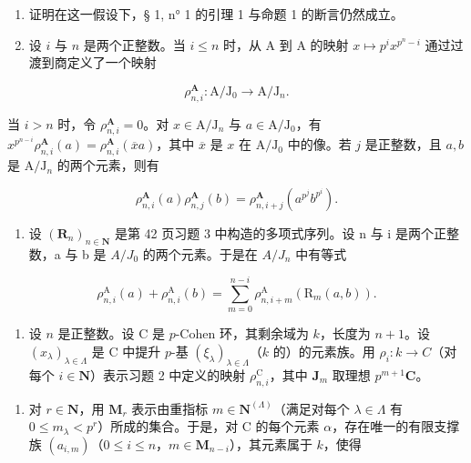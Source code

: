 \begin{enumerate}
\def\labelenumi{\alph{enumi})}
\item
  证明在这一假设下，§ 1, n° 1 的引理 1 与命题 1 的断言仍然成立。
\item
  设 \(i\) 与 \(n\) 是两个正整数。当 \(i \leqslant n\) 时，从 A 到 A 的映射 \(x \mapsto p^i x^{p^n - i}\) 通过过渡到商定义了一个映射
\end{enumerate}

\[
\rho_ {n, i} ^ {\mathbf {A}}: \mathrm{A} / \mathrm{J} _ {0} \rightarrow \mathrm{A} / \mathrm{J} _ {n}.
\]

当 \(i > n\) 时，令 \(\rho_{n,i}^{\mathbf{A}} = 0\)。对 \(x \in \mathrm{A} / \mathrm{J}_n\) 与 \(a \in \mathrm{A} / \mathrm{J}_0\)，有 \(x^{p^{n - i}} \rho_{n,i}^{\mathbf{A}}(a) = \rho_{n,i}^{\mathbf{A}}(\overline{x} a)\)，其中 \(\overline{x}\) 是 \(x\) 在 \(\mathrm{A} / \mathrm{J}_0\) 中的像。若 \(j\) 是正整数，且 \(a, b\) 是 \(\mathrm{A} / \mathrm{J}_n\) 的两个元素，则有

\[
\rho_ {n, i} ^ {\mathbf {A}} (a) \rho_ {n, j} ^ {\mathbf {A}} (b) = \rho_ {n, i + j} ^ {\mathbf {A}} \left(a ^ {p ^ {j}} b ^ {p ^ {i}}\right).
\]

\begin{enumerate}
\def\labelenumi{\alph{enumi})}
\setcounter{enumi}{2}
\tightlist
\item
  设 \((\mathbf{R}_{n})_{n\in\mathbf{N}}\) 是第 42 页习题 3 中构造的多项式序列。设 n 与 i 是两个正整数，a 与 b 是 \(A/J_{0}\) 的两个元素。于是在 \(A/J_{n}\) 中有等式
\end{enumerate}

\[
\rho_ {n, i} ^ {\mathrm{A}} (a) + \rho_ {n, i} ^ {\mathrm{A}} (b) = \sum_ {m = 0} ^ {n - i} \rho_ {n, i + m} ^ {\mathrm{A}} (\mathrm{R} _ {m} (a, b)).
\]

\begin{enumerate}
\def\labelenumi{\arabic{enumi})}
\setcounter{enumi}{2}
\tightlist
\item
  设 \(n\) 是正整数。设 C 是 \(p\)-Cohen 环，其剩余域为 \(k\)，长度为 \(n+1\)。设 \((x_{\lambda})_{\lambda\in\Lambda}\) 是 C 中提升 \(p\)-基 \((\xi_{\lambda})_{\lambda\in\Lambda}\)（\(k\) 的）的元素族。用 \(\rho_{i}:k\to C\)（对每个 \(i\in\mathbf{N}\)）表示习题 2 中定义的映射 \(\rho_{n,i}^{\mathrm{C}}\)，其中 \(\mathbf{J}_{m}\) 取理想 \(p^{m+1}\mathbf{C}\)。
\end{enumerate}

\begin{enumerate}
\def\labelenumi{\alph{enumi})}
\tightlist
\item
  对 \(r \in \mathbf{N}\)，用 \(\mathbf{M}_r\) 表示由重指标 \(m \in \mathbf{N}^{(\Lambda)}\)（满足对每个 \(\lambda \in \Lambda\) 有 \(0 \leqslant m_{\lambda} < p^{r}\)）所成的集合。于是，对 C 的每个元素 \(\alpha\)，存在唯一的有限支撑族 \((a_{i,m})\)（\(0 \leqslant i \leqslant n\)，\(m \in \mathbf{M}_{n-i}\)），其元素属于 \(k\)，使得
\end{enumerate}

